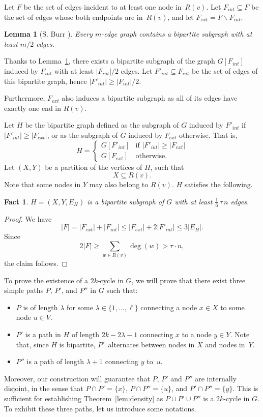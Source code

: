 \documentclass{article}
\newcommand{\bp}{X}
\newcommand{\tp}{Y}
\newtheorem{lemma}{Lemma}
\newtheorem{fact}{Fact}
\begin{document}
Let $F$ be the set of edges incident to at least one node in~$R(v)$. Let $F_{int}\subseteq F$ be the set of edges whose both endpoints are in~$R(v)$, and let $F_{ext}=F\smallsetminus F_{int}$.   

\begin{lemma}[S. Burr \cite{burr1982}]\label{lem:de-Burr}
Every $m$-edge graph contains a bipartite subgraph with at least $m/2$ edges.
\end{lemma}

Thanks to Lemma~\ref{lem:de-Burr}, there exists a bipartite subgraph of the graph $G[F_{int}]$ induced by $F_{int}$ with at least $|F_{int}|/2$ edges. Let $F'_{int}\subseteq F_{int}$ be the set of edges of this bipartite graph, hence $|F'_{int}|\geq |F_{int}|/2$.

Furthermore, $F_{ext}$ also induces a bipartite subgraph as all of its edges have exactly one end in $R(v)$.

Let $H$ be the bipartite graph defined as the subgraph of $G$ induced by $F'_{int}$ if $|F'_{int}|\geq |F_{ext}|$, or as the subgraph of $G$ induced by $F_{ext}$ otherwise. That is, 
\[
H=\left\{\begin{array}{ll}
G[F'_{int}] & \mbox{if $|F'_{int}|\geq |F_{ext}|$} \\
G[F_{ext}] & \mbox{otherwise.}
\end{array}\right.
\]
Let $(\bp,\tp)$ be a partition of the vertices of $H$, such that \[\bp\subseteq R(v).\] Note that some nodes in $\tp$ may also belong to $R(v)$. $H$ satisfies the following.

\begin{fact}\label{fact:size_edges}
$H=(\bp,\tp,E_H)$ is a bipartite subgraph of $G$ with at least $\frac16\, \tau\, n$ edges.
\end{fact}

\begin{proof}
We have 
\[
|F|= |F_{ext}|+|F_{int}| \leq |F_{ext}|+2|F'_{int}|\leq 3|E_H|.
\]
Since
\[
2 |F| \geq \sum_{w\in R(v)}\deg(w) >\tau \cdot n,
\]
the claim follows.
\end{proof}



To prove the existence of a $2k$-cycle in $G$, we will prove that there exist three simple paths $P$, $P'$, and $P''$ in $G$ such that:
\begin{itemize}
    \item $P$ is of length $\lambda$ for some  $\lambda\in\{1,\dots,\ell\}$ connecting a node $x\in \bp$ to some node $u\in V$.
    \item $P'$ is a path in $H$ of length $2k-2\lambda-1$ connecting $x$  to a node $y\in \tp$. Note that, since $H$ is bipartite, $P'$~alternates between nodes in $\bp$ and nodes in~$\tp$. 
    \item $P''$ is a path of length $\lambda+1$ connecting $y$ to~$u$.
\end{itemize}
Moreover, our construction will guarantee that $P$, $P'$ and $P''$ are internally disjoint, in the sense that $P\cap P'=\{x\}$, $P\cap P''=\{u\}$, and $P'\cap P''=\{y\}$. This is sufficient for establishing Theorem~\ref{lem:density} as $P\cup P'\cup P''$ is a $2k$-cycle in $G$. To exhibit these three paths, let us introduce some notations. 
\end{document}
